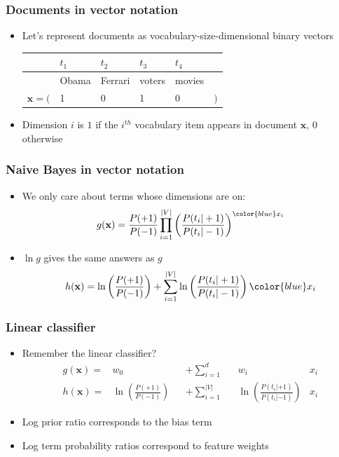 \documentclass[14pt,mathserif]{beamer}
\newcommand{\x}{\mathbf{x}}
\begin{document}
\begin{frame}
  \frametitle{Documents in vector notation}
  \begin{itemize}
  \item Let's represent documents as vocabulary-size-dimensional
    binary vectors 

    \begin{tabular}{rlllll}
          &    $t_1$& $t_2$   & $t_3$   & $t_4$   & \\\hline
          & Obama   & Ferrari & voters  & movies & \\\hline
$\x = ($   & 1       & 0       & 1       & 0 & $)$\\
    \end{tabular}
  \item Dimension $i$ is $1$ if the $i^{th}$ vocabulary item appears in
    document $\x$, $0$ otherwise
  \end{itemize}
\end{frame}

\begin{frame}
  \frametitle{Naive Bayes in vector notation}
  \begin{itemize}
  \item 
    We only care about terms whose dimensions are on:
    \[
      g(\x) = \frac{P(+1)}{P(-1)} \prod_{i=1}^{|V|} \left(\frac{P(t_i|+1)}{P(t_i|-1)}\right)^{\color{blue} x_i}
    \]
  \item $\ln g$ gives the same answers as $g$
    \begin{align}
      h(\x) = \ln\left(\frac{P(+1)}{P(-1)}\right) + \sum_{i=1}^{|V|} \ln\left(\frac{P(t_i|+1)}{P(t_i|-1)}\right)\color{blue}x_i
    \end{align}
  \end{itemize}
\end{frame}

\begin{frame}
  \frametitle{Linear classifier}
  \begin{itemize}
  \item Remember the linear classifier?
    \begin{align}\nonumber
      g(\x) = & w_0               &  & + \sum_{i=1}^d      && w_i 
                            & x_i \\\nonumber
      h(\x) = &  \ln\left(\frac{P(+1)}{P(-1)}\right)      &  & + \sum_{i=1}^{|V|}  &&  \ln\left(\frac{P(t_i|+1)}{P(t_i|-1)}\right)
                            & x_i 
    \end{align} 
  \item Log prior ratio corresponds to the bias term
  \item Log term probability ratios correspond to feature weights
  \end{itemize}
\end{frame}
\end{document}
